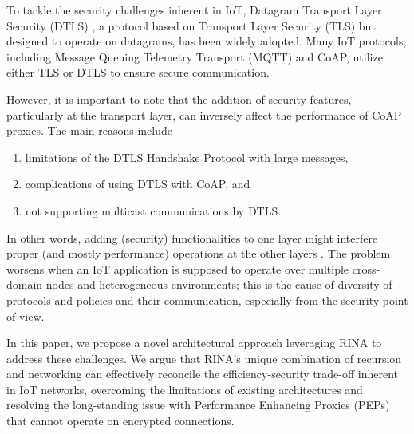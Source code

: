 \documentclass{ieeeaccess}
\begin{document}
To tackle the security challenges inherent in IoT, Datagram Transport Layer Security (DTLS) \cite{rfc6347}, a protocol based on Transport Layer Security (TLS) but designed to operate on datagrams, has been widely adopted. Many IoT protocols, including Message Queuing Telemetry Transport (MQTT) \cite{mqtt2014} and CoAP, utilize either TLS or DTLS to ensure secure communication.

However, it is important to note that the addition of security features, particularly at the transport layer, can inversely affect the performance of CoAP proxies. The main reasons include \cite{grammatikis2019securing}
\begin{enumerate}
	\item limitations of the DTLS Handshake Protocol with large messages,
	\item complications of using DTLS with CoAP, and
	\item not supporting multicast communications by DTLS.
\end{enumerate}

In other words, adding (security) functionalities to one layer might interfere proper (and mostly performance) operations at the other layers \cite{7005393}. The problem worsens when an IoT application is supposed to operate over multiple cross-domain nodes and heterogeneous environments; this is the cause of diversity of protocols and policies and their communication, especially from the security point of view. %

In this paper, we propose a novel architectural approach leveraging RINA to address these challenges. We argue that RINA's unique combination of recursion and networking can effectively reconcile the efficiency-security trade-off inherent in IoT networks, overcoming the limitations of existing architectures and resolving the long-standing issue with Performance Enhancing Proxies (PEPs) that cannot operate on encrypted connections.

\end{document}
